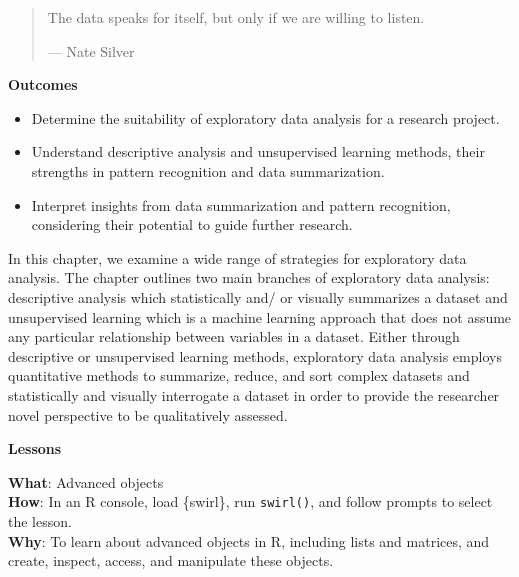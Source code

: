 \documentclass[
  letterpaper,
]{latex/krantz}
\providecommand{\tightlist}{%
  \setlength{\itemsep}{0pt}\setlength{\parskip}{0pt}}\usepackage{longtable,booktabs,array}
\theoremstyle{definition}
\theoremstyle{remark}
\begin{document}
\begin{quote}
The data speaks for itself, but only if we are willing to listen.

--- Nate Silver
\end{quote}

\begin{tcolorbox}[enhanced jigsaw, colback=white, opacityback=0, bottomrule=.15mm, rightrule=.15mm, breakable, left=2mm, arc=.35mm, colframe=quarto-callout-color-frame, leftrule=.75mm, toprule=.15mm]

\textbf{ Outcomes}

\begin{itemize}
\tightlist
\item
  Determine the suitability of exploratory data analysis for a research
  project.
\item
  Understand descriptive analysis and unsupervised learning methods,
  their strengths in pattern recognition and data summarization.
\item
  Interpret insights from data summarization and pattern recognition,
  considering their potential to guide further research.
\end{itemize}

\end{tcolorbox}

In this chapter, we examine a wide range of strategies for exploratory
data analysis. The chapter outlines two main branches of exploratory
data analysis: descriptive analysis which statistically and/ or visually
summarizes a dataset and unsupervised learning which is a machine
learning approach that does not assume any particular relationship
between variables in a dataset. Either through descriptive or
unsupervised learning methods, exploratory data analysis employs
quantitative methods to summarize, reduce, and sort complex datasets and
statistically and visually interrogate a dataset in order to provide the
researcher novel perspective to be qualitatively assessed.

\begin{tcolorbox}[enhanced jigsaw, colback=white, opacityback=0, bottomrule=.15mm, rightrule=.15mm, breakable, left=2mm, arc=.35mm, colframe=quarto-callout-color-frame, leftrule=.75mm, toprule=.15mm]

\textbf{ Lessons}

\textbf{What}: Advanced objects\\
\textbf{How}: In an R console, load \{swirl\}, run \texttt{swirl()}, and
follow prompts to select the lesson.\\
\textbf{Why}: To learn about advanced objects in R, including lists and
matrices, and create, inspect, access, and manipulate these objects.

\end{tcolorbox}
\end{document}
